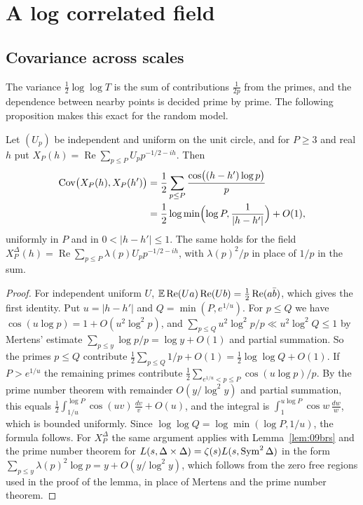 \section{A log correlated field}\label{sec:09blogcorr}

\subsection{Covariance across scales}

The variance $\frac12\log\log T$ is the sum of contributions $\frac1{2p}$ from the primes, and the dependence between nearby points is decided prime by prime. The following proposition makes this exact for the random model.

\begin{proposition}\label{prop:09bcov}
Let $(U_p)$ be independent and uniform on the unit circle, and for $P\ge3$ and real $h$ put $X_P(h)=\operatorname{Re}\sum_{p\le P}U_pp^{-1/2-ih}$. Then
\begin{align*}
\operatorname{Cov}\bigl(X_P(h),X_P(h')\bigr)&=\frac12\sum_{p\le P}\frac{\cos\bigl((h-h')\log p\bigr)}{p}\\
&=\frac12\log\min\Bigl(\log P,\frac{1}{|h-h'|}\Bigr)+O(1),
\end{align*}
uniformly in $P$ and in $0<|h-h'|\le1$. The same holds for the field $X^\Delta_P(h)=\operatorname{Re}\sum_{p\le P}\lambda(p)U_pp^{-1/2-ih}$, with $\lambda(p)^2/p$ in place of $1/p$ in the sum.
\end{proposition}

\begin{proof}
For independent uniform $U$, $\mathbb{E}\operatorname{Re}(Ua)\operatorname{Re}(Ub)=\frac12\operatorname{Re}(a\bar b)$, which gives the first identity. Put $u=|h-h'|$ and $Q=\min(P,e^{1/u})$. For $p\le Q$ we have $\cos(u\log p)=1+O(u^2\log^2p)$, and $\sum_{p\le Q}u^2\log^2p/p\ll u^2\log^2Q\le1$ by Mertens' estimate $\sum_{p\le y}\log p/p=\log y+O(1)$ and partial summation. So the primes $p\le Q$ contribute $\frac12\sum_{p\le Q}1/p+O(1)=\frac12\log\log Q+O(1)$. If $P>e^{1/u}$ the remaining primes contribute $\frac12\sum_{e^{1/u}<p\le P}\cos(u\log p)/p$. By the prime number theorem with remainder $O(y/\log^2y)$ and partial summation, this equals $\frac12\int_{1/u}^{\log P}\cos(uv)\,\frac{dv}{v}+O(u)$, and the integral is $\int_1^{u\log P}\cos w\,\frac{dw}{w}$, which is bounded uniformly. Since $\log\log Q=\log\min(\log P,1/u)$, the formula follows. For $X^\Delta_P$ the same argument applies with Lemma~\ref{lem:09brs} and the prime number theorem for $L(s,\Delta\times\Delta)=\zeta(s)L(s,\operatorname{Sym}^2\Delta)$ in the form $\sum_{p\le y}\lambda(p)^2\log p=y+O(y/\log^2y)$, which follows from the zero free regions used in the proof of the lemma, in place of Mertens and the prime number theorem.
\end{proof}

